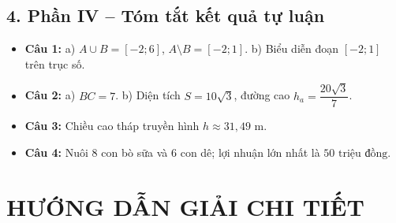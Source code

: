 \documentclass[12pt,a4paper]{article}
\begin{document}
\subsection*{4. Phần IV -- Tóm tắt kết quả tự luận}
\begin{itemize}[leftmargin=0.6cm, itemsep=2pt]
    \item \textbf{Câu 1:} a) $A \cup B = [-2; 6]$, $A \setminus B = [-2; 1]$. b) Biểu diễn đoạn $[-2; 1]$ trên trục số.
    \item \textbf{Câu 2:} a) $BC = 7$. b) Diện tích $S = 10\sqrt{3}$, đường cao $h_a = \dfrac{20\sqrt{3}}{7}$.
    \item \textbf{Câu 3:} Chiều cao tháp truyền hình $h \approx 31{,}49\text{ m}$.
    \item \textbf{Câu 4:} Nuôi $8$ con bò sữa và $6$ con dê; lợi nhuận lớn nhất là $50\text{ triệu đồng}$.
\end{itemize}

\newpage
\section*{HƯỚNG DẪN GIẢI CHI TIẾT}
\end{document}
